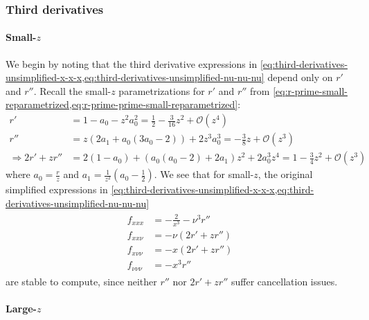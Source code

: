 \documentclass{article}
\begin{document}
\subsubsection{Third derivatives}\label{sec:rician-third-derivatives}

\paragraph{Small-$z$}

We begin by noting that the third derivative expressions in \cref{eq:third-derivatives-unsimplified-x-x-x,eq:third-derivatives-unsimplified-nu-nu-nu} depend only on $r'$ and $r''$.
Recall the small-$z$ parametrizations for $r'$ and $r''$ from \cref{eq:r-prime-small-reparametrized,eq:r-prime-prime-small-reparametrized}:
%
\begin{align}
  r'                      & = 1 - a_0 - z^2 a_0^2 = \frac{1}{2} - \frac{3}{16}z^2 + \mathcal{O}(z^4)                          \\
  r''                     & = z (2a_1 + a_0 (3 a_0 - 2)) + 2 z^3 a_0^3 = -\frac{3}{8}z + \mathcal{O}(z^3)                     \\
  \Rightarrow 2r' + z r'' & = 2 (1 - a_0) + (a_0 (a_0 - 2) + 2 a_1) z^2 + 2 a_0^3 z^4 = 1 - \frac{3}{4}z^2 + \mathcal{O}(z^3)
\end{align}
%
where $a_0 = \frac{r}{z}$ and $a_1 = \frac{1}{z^2} (a_0 - \frac{1}{2})$.
We see that for small-$z$, the original simplified expressions in \cref{eq:third-derivatives-unsimplified-x-x-x,eq:third-derivatives-unsimplified-nu-nu-nu}
%
\begin{align}\label{eq:third-derivatives-small-z}
  \boxed{
    \begin{aligned}
      f_{xxx}       & = -\frac{2}{x^3} - \nu^3 r'' \\
      f_{xx\nu}     & = -\nu(2r' + z r'')          \\
      f_{x\nu\nu}   & = -x(2r' + z r'')            \\
      f_{\nu\nu\nu} & = -x^3 r''
    \end{aligned}
  }
\end{align}
%
are stable to compute, since neither $r''$ nor $2r' + z r''$ suffer cancellation issues.

\paragraph{Large-$z$}
\end{document}
